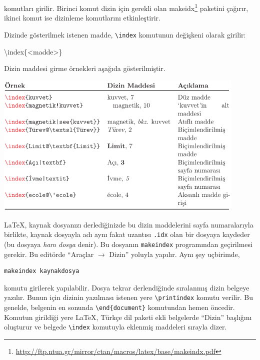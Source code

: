 \documentclass[
  10pt,
]{scrbook}
\newenvironment{Shaded}{\begin{snugshade}}{\end{snugshade}}
\newcommand{\FunctionTok}[1]{\textcolor[rgb]{0.00,0.00,0.00}{#1}}
\newcommand{\NormalTok}[1]{#1}
\renewcommand{\href}[2]{#2\footnote{\url{#1}}}
\theoremstyle{definition}
\theoremstyle{definition}
\theoremstyle{definition}
\theoremstyle{definition}
\theoremstyle{remark}
\begin{document}
komutları girilir. Birinci komut dizin için gerekli olan
\href{http://ftp.ntua.gr/mirror/ctan/macros/latex/base/makeindx.pdf}{makeidx} paketini çağırır, ikinci komut ise dizinleme
komutlarını etkinleştirir.

Dizinde gösterilmek istenen madde, \texttt{\textbackslash{}index} komutunun değişkeni olarak
girilir:

\begin{Shaded}
\begin{Highlighting}[]
\FunctionTok{\textbackslash{}index}\NormalTok{\{\textless{}madde\textgreater{}\}}
\end{Highlighting}
\end{Shaded}

Dizin maddesi girme örnekleri aşağıda gösterilmiştir.

\includegraphics[width=0.9\textwidth,height=\textheight]{images/dizina.png}

LaTeX, kaynak dosyanızı derlediğinizde bu dizin maddelerini sayfa
numaralarıyla birlikte, kaynak dosyayla adı aynı fakat uzantısı \texttt{.idx}
olan bir dosyaya kaydeder (bu dosyaya \emph{ham dosya} denir). Bu dosyanın
\texttt{makeindex} programından geçirilmesi gerekir. Bu editörde ``Araçlar \(\rightarrow\) Dizin'' yoluyla yapılır. Aynı şey uçbirimde,

\begin{verbatim}
makeindex kaynakdosya
\end{verbatim}

komutu girilerek yapılabilir. Dosya tekrar derlendiğinde sıralanmış
dizin belgeye yazılır. Bunun için dizinin yazılması istenen yere
\texttt{\textbackslash{}printindex} komutu verilir. Bu genelde, belgenin en sonunda
\texttt{\textbackslash{}end\{document\}} komutundan hemen öncedir. Komutun girildiği yere LaTeX,
Türkçe dil paketi ekli belgelerde ``Dizin'' başlığını oluşturur ve belgede
\texttt{\textbackslash{}index} komutuyla eklenmiş maddeleri sırayla dizer.
\end{document}
